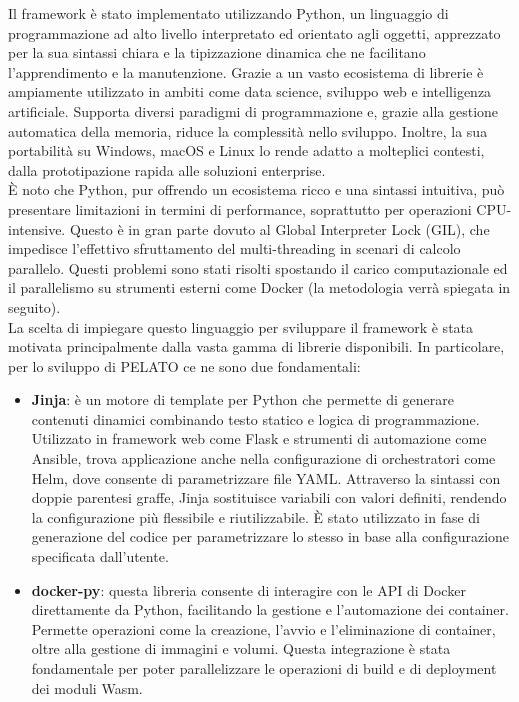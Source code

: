 Il framework è stato implementato utilizzando Python, un linguaggio di programmazione ad alto livello interpretato ed orientato agli oggetti, apprezzato per la sua sintassi chiara e la tipizzazione dinamica che ne facilitano l'apprendimento e la manutenzione. Grazie a un vasto ecosistema di librerie è ampiamente utilizzato in ambiti come data science, sviluppo web e intelligenza artificiale. Supporta diversi paradigmi di programmazione e, grazie alla gestione automatica della memoria, riduce la complessità nello sviluppo. Inoltre, la sua portabilità su Windows, macOS e Linux lo rende adatto a molteplici contesti, dalla prototipazione rapida alle soluzioni enterprise.\\
È noto che Python, pur offrendo un ecosistema ricco e una sintassi intuitiva, può presentare limitazioni in termini di performance, soprattutto per operazioni CPU-intensive. Questo è in gran parte dovuto al Global Interpreter Lock (GIL), che impedisce l'effettivo sfruttamento del multi-threading in scenari di calcolo parallelo. Questi problemi sono stati risolti spostando il carico computazionale ed il parallelismo su strumenti esterni come Docker (la metodologia verrà spiegata in seguito).\\
La scelta di impiegare questo linguaggio per sviluppare il framework è stata motivata principalmente dalla vasta gamma di librerie disponibili. In particolare, per lo sviluppo di PELATO ce ne sono due fondamentali:
\begin{itemize}
    \item \textbf{Jinja}: è un motore di template per Python che permette di generare contenuti dinamici combinando testo statico e logica di programmazione. Utilizzato in framework web come Flask e strumenti di automazione come Ansible, trova applicazione anche nella configurazione di orchestratori come Helm, dove consente di parametrizzare file YAML. Attraverso la sintassi con doppie parentesi graffe, Jinja sostituisce variabili con valori definiti, rendendo la configurazione più flessibile e riutilizzabile. È stato utilizzato in fase di generazione del codice per parametrizzare lo stesso in base alla configurazione specificata dall'utente.
    \item \textbf{docker-py}: questa libreria consente di interagire con le API di Docker direttamente da Python, facilitando la gestione e l'automazione dei container. Permette operazioni come la creazione, l'avvio e l'eliminazione di container, oltre alla gestione di immagini e volumi. Questa integrazione è stata fondamentale per poter parallelizzare le operazioni di build e di deployment dei moduli Wasm.
\end{itemize}


